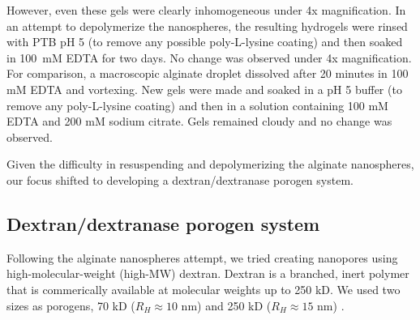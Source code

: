 However, even these gels were clearly inhomogeneous under 4x magnification.  In an attempt to depolymerize the nanospheres, the resulting hydrogels were rinsed with PTB pH 5 (to remove any possible poly-L-lysine coating) and then soaked in 100~mM EDTA for two days.  No change was observed under 4x magnification.  For comparison, a macroscopic alginate droplet dissolved after 20 minutes in 100 mM EDTA and vortexing.  New gels were made and soaked in a pH 5 buffer (to remove any poly-L-lysine coating) and then in a solution containing 100 mM EDTA and 200 mM sodium citrate.  Gels remained cloudy and no change was observed.

Given the difficulty in resuspending and depolymerizing the alginate nanospheres, our focus shifted to developing a dextran/dextranase porogen system.

\subsection{Dextran/dextranase porogen system}
Following the alginate nanospheres attempt, we tried creating nanopores using high-molecular-weight (high-MW) dextran.  Dextran is a branched, inert polymer that is commerically available at molecular weights up to 250 kD.  We used two sizes as porogens, 70 kD ($R_H \approx 10$ nm) and 250 kD ($R_H \approx 15$ nm) \cite{masuelli13}.  

